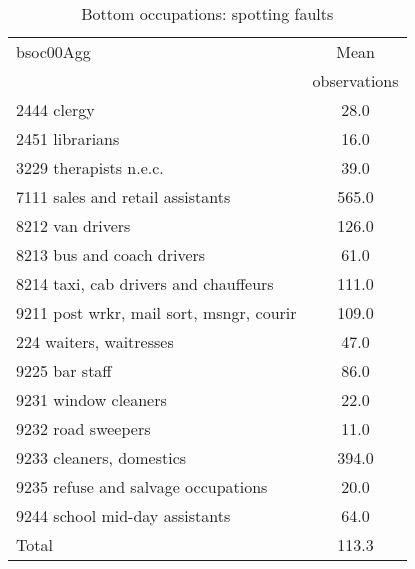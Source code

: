 \begin{table}
	\centering
	\caption{Bottom occupations: spotting faults}
	\label{tab:bottomcfaults}
	\begin{tabular}{lc}
	\toprule	
		
bsoc00Agg&Mean \\
&observations \\
\hline
2444 clergy&28.0 \\
2451 librarians&16.0 \\
3229 therapists n.e.c.&39.0 \\
7111 sales and retail assistants&565.0 \\
8212 van drivers&126.0 \\
8213 bus and coach drivers&61.0 \\
8214 taxi, cab drivers and chauffeurs&111.0 \\
9211 post wrkr, mail sort, msngr, courir&109.0 \\
224 waiters, waitresses&47.0 \\
9225 bar staff&86.0 \\
9231 window cleaners&22.0 \\
9232 road sweepers&11.0 \\
9233 cleaners, domestics&394.0 \\
9235 refuse and salvage occupations&20.0 \\
9244 school mid-day assistants&64.0 \\
Total&113.3 \\
\bottomrule
\bottomrule
\end{tabular}
\end{table}
